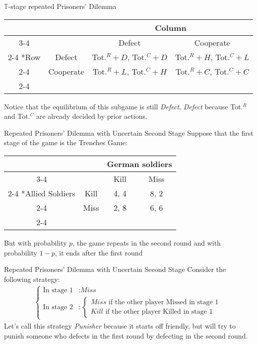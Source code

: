 \begin{frame}{$\mathbb{T}$-stage repeated Prisoners' Dilemma}
  \begin{center}
    \begin{tabular}{*{4}{c|}}
      \multicolumn{2}{c}{} & \multicolumn{2}{c}{Column} \\ \cline{3-4}
      \multicolumn{1}{c}{} &        & Defect & Cooperate \\ \cline{2-4}
      \multirow{2}*{Row} & Defect   & Tot.$^R + D$, Tot.$^C + D$ & Tot.$^R + H$, Tot.$^C + L$ \\ \cline{2-4}
                         & Cooperate& Tot.$^R + L$, Tot.$^C + H$ & Tot.$^R + C$, Tot.$^C + C$ \\ \cline{2-4}
    \end{tabular} 
  \end{center}
  Notice that the equilibrium of this subgame is still \textit{Defect}, \textit{Defect}
  because Tot.$^R$ and Tot.$^C$ are already decided by prior actions. 
\end{frame}

\begin{frame}{Repeated Prisoners' Dilemma with Uncertain Second Stage}
  Suppose that the first stage of the game is the Trenches Game:
  \begin{table}[!h]
    \centering
    \begin{tabular}{*{4}{c|}}
      \multicolumn{2}{c}{} & \multicolumn{2}{c}{German soldiers} \\ \cline{3-4}
      \multicolumn{1}{c}{} &    & Kill & Miss \\ \cline{2-4}
      \multirow{2}*{Allied Soldiers} & Kill & 4, 4 & 8, 2 \\ \cline{2-4}
                         & Miss & 2, 8 & 6, 6 \\ \cline{2-4} 
    \end{tabular} 
  \end{table}
  But with probability $p$, the game repeats in the second round 
  and with probability $1-p$, it ends after the first round
\end{frame}

\begin{frame}{Repeated Prisoners' Dilemma with Uncertain Second Stage}
  Consider the following strategy: 
  \begin{align*}
    \begin{cases}
      \text{In stage } 1 & : \textit{Miss} \\ 
      \text{In stage } 2 & : 
      \begin{cases}
        \textit{Miss} \text{  if the other player Missed in stage 1} \\ 
        \textit{Kill} \text{  if the other player Killed in stage 1}
      \end{cases}
    \end{cases}
  \end{align*}
  Let's call this strategy \textit{Punisher} because it starts off friendly, 
  but will try to punish someone who defects in the first round by defecting in the second round.
\end{frame}


